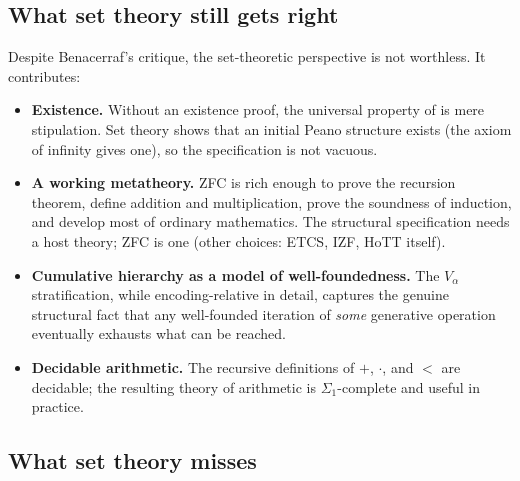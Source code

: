 \documentclass[12pt]{article}
\theoremstyle{definition}
\theoremstyle{remark}
\begin{document}
\subsection{What set theory still gets right}

Despite Benacerraf's critique, the set-theoretic perspective is not
worthless. It contributes:

\begin{itemize}
\item \textbf{Existence.} Without an existence proof, the universal property
of  is mere stipulation. Set theory shows that an
initial Peano structure exists (the axiom of infinity gives one), so the
specification is not vacuous.

\item \textbf{A working metatheory.} ZFC is rich enough to prove the
recursion theorem, define addition and multiplication, prove the soundness
of induction, and develop most of ordinary mathematics. The structural
specification needs a host theory; ZFC is one (other choices: ETCS, IZF,
HoTT itself).

\item \textbf{Cumulative hierarchy as a model of well-foundedness.} The
$V_\alpha$ stratification, while encoding-relative in detail, captures the
genuine structural fact that any well-founded iteration of \emph{some}
generative operation eventually exhausts what can be reached.

\item \textbf{Decidable arithmetic.} The recursive definitions of $+$,
$\cdot$, and $<$ are decidable; the resulting theory of arithmetic is
$\Sigma_1$-complete and useful in practice.
\end{itemize}

\subsection{What set theory misses}
\end{document}
